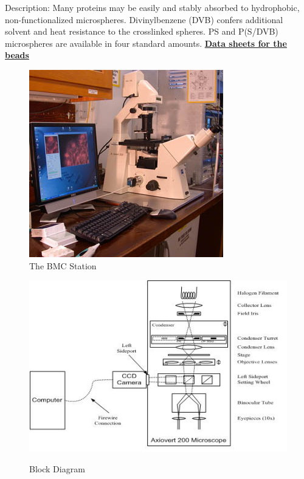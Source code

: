 \documentclass{../lab}
\begin{document}
Description: Many proteins may be easily and stably absorbed to hydrophobic, non-functionalized microspheres. Divinylbenzene (DVB) confers additional solvent and heat resistance to the crosslinked spheres. PS and P(S/DVB) microspheres are available in four standard amounts. \href{http://physics111.lib.berkeley.edu/Physics111/Reprints/BMC/Colloid\%20Data\%20Sheets.pdf}{\textbf{Data sheets for the beads}} \\

\begin{figure}[h]
\begin{minipage}{.49\linewidth}
    \href{http://experimentationlab.berkeley.edu/sites/default/files/images/BMC_Station319.jpg}{\includegraphics[width=\linewidth,keepaspectratio]{images/BMC_Station319.jpg}} \\
    \caption{The BMC Station}
\end{minipage}\hfill
\begin{minipage}{.49\linewidth}
    \href{http://experimentationlab.berkeley.edu/sites/default/files/images/Setup2.jpg}{\includegraphics[width=\linewidth,keepaspectratio]{images/Setup2.jpg}} \\
    \caption{Block Diagram}
\end{minipage}
\end{figure}
\end{document}
